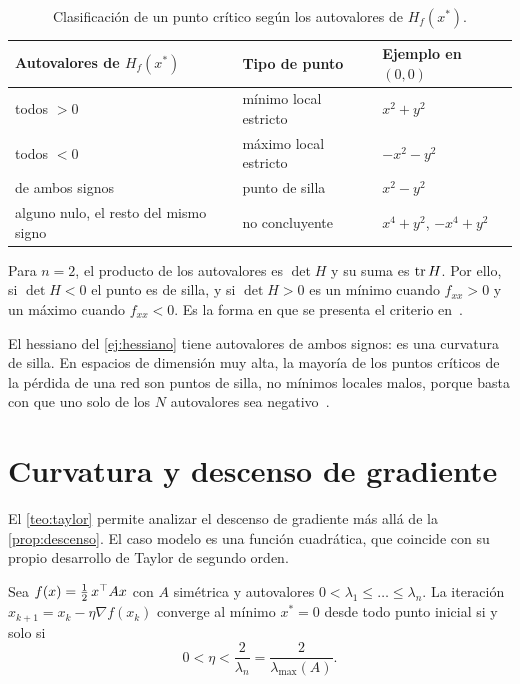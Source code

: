 \begin{table}[h]
\centering\small
\caption{Clasificación de un punto crítico según los autovalores de $H_f(x^{*})$.}\label{tab:criterio}
\begin{tabular}{@{}lll@{}}
\toprule
Autovalores de $H_f(x^{*})$ & Tipo de punto & Ejemplo en $(0,0)$ \\
\midrule
todos $>0$ & mínimo local estricto & $x^{2}+y^{2}$ \\
todos $<0$ & máximo local estricto & $-x^{2}-y^{2}$ \\
de ambos signos & punto de silla & $x^{2}-y^{2}$ \\
alguno nulo, el resto del mismo signo & no concluyente & $x^{4}+y^{2}$, $-x^{4}+y^{2}$ \\
\bottomrule
\end{tabular}
\end{table}

\begin{observacion}
Para $n=2$, el producto de los autovalores es $\det H$ y su suma es $\operatorname{tr} H$. Por ello, si $\det H<0$ el punto es de silla, y si $\det H>0$ es un mínimo cuando $f_{xx}>0$ y un máximo cuando $f_{xx}<0$. Es la forma en que se presenta el criterio en~\cite[clase~9]{mit1802}.
\end{observacion}

\begin{observacion}
El hessiano del \cref{ej:hessiano} tiene autovalores de ambos signos: es una curvatura de silla. En espacios de dimensión muy alta, la mayoría de los puntos críticos de la pérdida de una red son puntos de silla, no mínimos locales malos, porque basta con que uno solo de los $N$ autovalores sea negativo~\cite{dauphin}.
\end{observacion}

\section{Curvatura y descenso de gradiente}

El \cref{teo:taylor} permite analizar el descenso de gradiente más allá de la \cref{prop:descenso}. El caso modelo es una función cuadrática, que coincide con su propio desarrollo de Taylor de segundo orden.

\begin{proposicion}\label{prop:dg-cuadratica}
Sea $f(x)=\tfrac12\,x^{\top} Ax$ con $A$ simétrica y autovalores $0<\lambda_1\le\dots\le\lambda_n$. La iteración $x_{k+1}=x_k-\eta\nabla f(x_k)$ converge al mínimo $x^{*}=0$ desde todo punto inicial si y solo si
\[
0<\eta<\frac{2}{\lambda_n}=\frac{2}{\lambda_{\max}(A)}.
\]
\end{proposicion}

